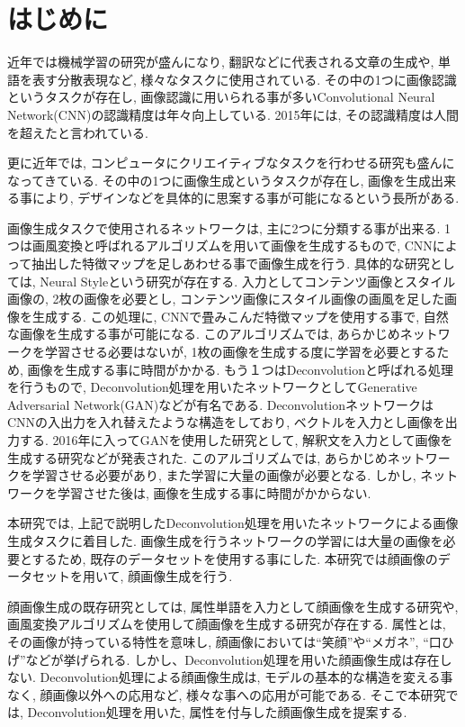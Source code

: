 \chapter{はじめに}
近年では機械学習の研究が盛んになり, 翻訳などに代表される文章の生成や, 単語を表す分散表現など, 様々なタスクに使用されている. その中の1つに画像認識というタスクが存在し, 画像認識に用いられる事が多いConvolutional Neural Network(CNN)\cite{cnn}の認識精度は年々向上している. 2015年には, その認識精度は人間を超えたと言われている\cite{fujitsu}. 

更に近年では, コンピュータにクリエイティブなタスクを行わせる研究も盛んになってきている. その中の1つに画像生成というタスクが存在し, 画像を生成出来る事により, デザインなどを具体的に思案する事が可能になるという長所がある. 

画像生成タスクで使用されるネットワークは, 主に2つに分類する事が出来る. 1つは画風変換と呼ばれるアルゴリズムを用いて画像を生成するもので, CNNによって抽出した特徴マップを足しあわせる事で画像生成を行う. 具体的な研究としては, Neural Styleという研究が存在する\cite{neuralstyle}. 
入力としてコンテンツ画像とスタイル画像の, 2枚の画像を必要とし, コンテンツ画像にスタイル画像の画風を足した画像を生成する. この処理に, CNNで畳みこんだ特徴マップを使用する事で, 自然な画像を生成する事が可能になる. このアルゴリズムでは, あらかじめネットワークを学習させる必要はないが, 1枚の画像を生成する度に学習を必要とするため, 画像を生成する事に時間がかかる. 
もう１つはDeconvolutionと呼ばれる処理を行うもので, Deconvolution処理を用いたネットワークとしてGenerative Adversarial Network(GAN)などが有名である\cite{gan}. DeconvolutionネットワークはCNNの入出力を入れ替えたような構造をしており, ベクトルを入力とし画像を出力する. 2016年に入ってGANを使用した研究として, 解釈文を入力として画像を生成する研究などが発表された\cite{fromcaption}. 
このアルゴリズムでは, あらかじめネットワークを学習させる必要があり, また学習に大量の画像が必要となる. しかし, ネットワークを学習させた後は, 画像を生成する事に時間がかからない. 

本研究では, 上記で説明したDeconvolution処理を用いたネットワークによる画像生成タスクに着目した. 画像生成を行うネットワークの学習には大量の画像を必要とするため, 既存のデータセットを使用する事にした. 本研究では顔画像のデータセットを用いて, 顔画像生成を行う. 

顔画像生成の既存研究としては, 属性単語を入力として顔画像を生成する研究\cite{attr2image}や, 画風変換アルゴリズムを使用して顔画像を生成する研究\cite{dfi}が存在する. 属性とは, その画像が持っている特性を意味し, 顔画像においては``笑顔''や``メガネ'', ``口ひげ''などが挙げられる. しかし、Deconvolution処理を用いた顔画像生成は存在しない. Deconvolution処理による顔画像生成は, モデルの基本的な構造を変える事なく, 顔画像以外への応用など, 様々な事への応用が可能である. 
そこで本研究では, Deconvolution処理を用いた, 属性を付与した顔画像生成を提案する. 

